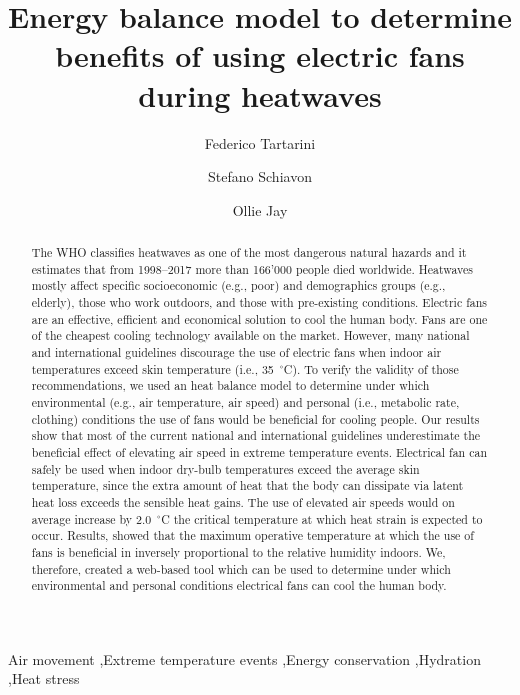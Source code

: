 
\begin{frontmatter}

\title{Energy balance model to determine benefits of using electric fans during heatwaves}

\author[sinBerBest]{Federico Tartarini}
\author[CBE]{Stefano Schiavon}
\author[USYD]{Ollie Jay}

\address[sinBerBest]{SinBerBEST, Berkeley Education Alliance for Research in Singapore, Singapore}
\address[CBE]{Center for the Built Environment, University of California, Berkeley, USA}
\address[USYD]{Sydney School ofHealth Sciences, Faculty ofMedicine and Health, The University ofSydney, Sydney, Australia}

\begin{abstract}
    The WHO classifies heatwaves as one of the most dangerous natural hazards and it estimates that from 1998--2017 more than 166'000 people died worldwide.
    Heatwaves mostly affect specific socioeconomic (e.g., poor) and demographics groups (e.g., elderly), those who work outdoors, and those with pre-existing conditions.
    Electric fans are an effective, efficient and economical solution to cool the human body.
    Fans are one of the cheapest cooling technology available on the market.
    However, many national and international guidelines discourage the use of electric fans when indoor air temperatures exceed skin temperature (i.e., 35~$^{\circ}$C).
    To verify the validity of those recommendations, we used an heat balance model to determine under which environmental (e.g., air temperature, air speed) and personal (i.e., metabolic rate, clothing) conditions the use of fans would be beneficial for cooling people.
    Our results show that most of the current national and international guidelines underestimate the beneficial effect of elevating air speed in extreme temperature events.
    Electrical fan can safely be used when indoor dry-bulb temperatures exceed the average skin temperature, since the extra amount of heat that the body can dissipate via latent heat loss exceeds the sensible heat gains.
    The use of elevated air speeds would on average increase by 2.0~$^{\circ}$C the critical temperature at which heat strain is expected to occur.
    Results, showed that the maximum operative temperature at which the use of fans is beneficial in inversely proportional to the relative humidity indoors.
    We, therefore, created a web-based tool which can be used to determine under which environmental and personal conditions electrical fans can cool the human body.
\end{abstract}

\begin{keyword}
Air movement \sep Extreme temperature events \sep Energy conservation \sep Hydration \sep Heat stress
\end{keyword}

\end{frontmatter}
